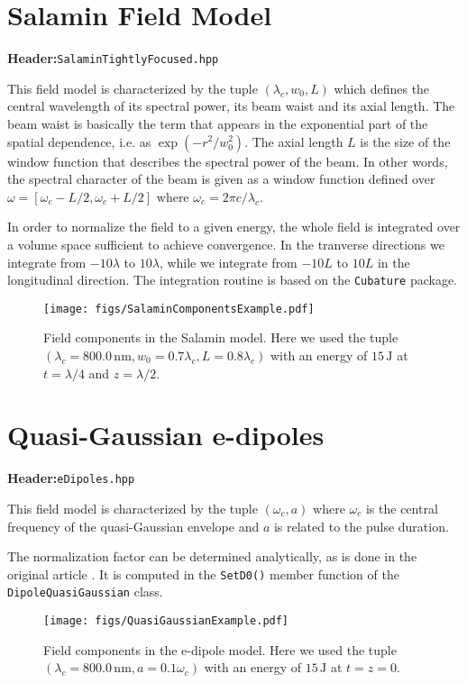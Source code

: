 \documentclass[10pt,letterpaper,extrafontsizes, onecolumn,openright]{memoir}
\begin{document}
\section{Salamin Field Model}
\textbf{Header:}\hfill\texttt{SalaminTightlyFocused.hpp}
\vspace{0.5cm}

This field model is characterized by the tuple $(\lambda_c,w_0,L)$ which
defines the central wavelength of its spectral power, its beam waist and
its axial length. The beam waist is basically the term that appears in the exponential
part of the spatial dependence, i.e. as $\exp(-r^2/w_0^2)$. The axial length $L$
is the size of the window function that describes the spectral power of the beam.
In other words, the spectral character of the beam is given as a window function
defined over $\omega=[\omega_c-L/2,­\omega_c+L/2]$ where $\omega_c=2\pi c/\lambda_c$.

In order to normalize the field to a given energy, the whole field is integrated
over a volume space sufficient to achieve convergence. In the tranverse
directions we integrate from $-10\lambda$ to $10\lambda$, while we integrate
from $-10L$ to $10L$ in the longitudinal direction. The integration routine
is based on the \texttt{Cubature} package.

\begin{figure}
	\centering
	\texttt{[image: figs/SalaminComponentsExample.pdf]}
	\caption{Field components in the Salamin model. Here we used the tuple
	$(\lambda_c=800.0\,\si{\nano\metre},w_0=0.7\lambda_c, L=0.8\lambda_c)$
	with an energy of $15\,\si{\joule}$ at $t=\lambda/4$ and $z=\lambda/2$.}
\end{figure}

\section{Quasi-Gaussian e-dipoles}
\textbf{Header:}\hfill\texttt{eDipoles.hpp}
\vspace{0.5cm}

This field model is characterized by the tuple $(\omega_c,a)$ where $\omega_c$
is the central frequency of the quasi-Gaussian envelope and $a$ is related
to the pulse duration.

The normalization factor can be determined analytically, as is done
in the original article \cite{GON2012}. It is computed in the \texttt{SetD0()}
member function of the \texttt{DipoleQuasiGaussian} class.

\begin{figure}
	\centering
	\texttt{[image: figs/QuasiGaussianExample.pdf]}
	\caption{Field components in the e-dipole model. Here we used the tuple
	$(\lambda_c=800.0\,\si{\nano\metre},a=0.1\omega_c)$
	with an energy of $15\,\si{\joule}$ at $t=z=0$.}
\end{figure}

\appendix



\end{document}
